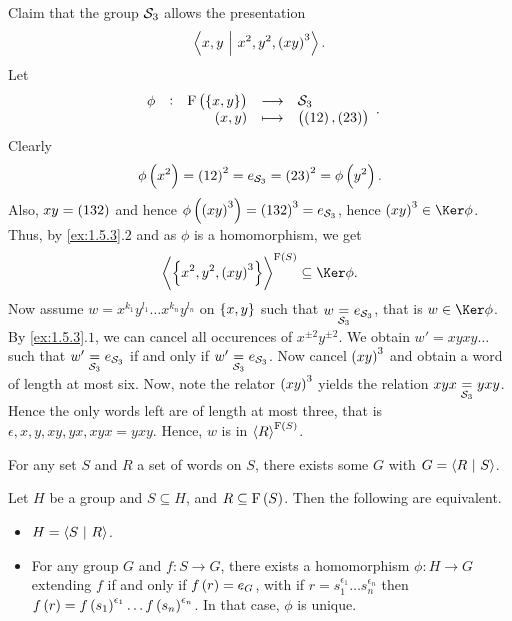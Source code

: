 \begin{example}
Claim that the group $ \mathcal{S}_3 $ allows the presentation
$$ \abr{x, y \st x^2, y^2, \br{xy}^3}. $$
Let
$$ \function[\phi]{\F\br{\cbr{x, y}}}{\SSS_3}{\br{x, y}}{\br{\br{12}, \br{23}}}. $$
Clearly
$$ \phi\br{x^2} = \br{12}^2 = e_{\SSS_3} = \br{23}^2 = \phi\br{y^2}. $$
Also, $ xy = \br{132} $ and hence $ \phi\br{\br{xy}^3} = \br{132}^3 = e_{\SSS_3} $, hence $ \br{xy}^3 \in \Ker \phi $. Thus, by \ref{ex:1.5.3}.$ 2 $ and as $ \phi $ is a homomorphism, we get
$$ \abr{\cbr{x^2, y^2, \br{xy}^3}}^{\F\br{S}} \subseteq \Ker \phi. $$
Now assume $ w = x^{k_1}y^{l_1} \dots x^{k_n}y^{l_n} $ on $ \cbr{x, y} $ such that $ w \underset{\mathcal{S}_3}{=} e_{\mathcal{S}_3} $, that is $ w \in \Ker \phi $. By \ref{ex:1.5.3}.$ 1 $, we can cancel all occurences of $ x^{\pm 2}y^{\pm 2} $. We obtain $ w' = xyxy \dots $ such that $ w' \underset{\mathcal{S}_3}{=} e_{\mathcal{S}_3} $ if and only if $ w' \underset{\mathcal{S}_3}{=} e_{\mathcal{S}_3} $. Now cancel $ \br{xy}^3 $ and obtain a word of length at most six. Now, note the relator $ \br{xy}^3 $ yields the relation $ xyx \underset{\mathcal{S}_3}{=} yxy $. Hence the only words left are of length at most three, that is $ \epsilon, x, y, xy, yx, xyx = yxy $. Hence, $ w $ is in $ \abr{R}^{\F\br{S}} $.
\end{example}

\pagebreak

\begin{exercise}
For any set $ S $ and $ R $ a set of words on $ S $, there exists some $ G $ with $ G = \left\langle R \ \middle| \  S \right\rangle $.
\end{exercise}

\begin{proposition}
Let $ H $ be a group and $ S \subseteq H $, and $ R \subseteq \F\br{S} $. Then the following are equivalent.
\begin{itemize}
\item $ H = \left\langle S \ \middle| \  R \right\rangle $.
\item For any group $ G $ and $ f : S \to G $, there exists a homomorphism $ \phi : H \to G $ extending $ f $ if and only if $ f\br{r} = e_G $, with if $ r = s_1^{\epsilon_1} \dots s_n^{\epsilon_n} $ then $ f\br{r} = f\br{s_1}^{\epsilon_1} \dots f\br{s_n}^{\epsilon_n} $. In that case, $ \phi $ is unique.
\end{itemize}
\end{proposition}


